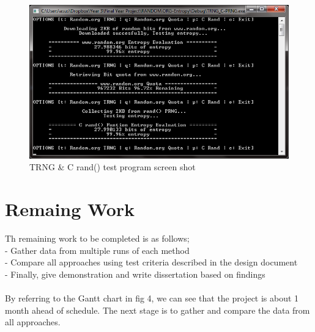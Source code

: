\documentclass[a4paper,10.5pt]{article}
\begin{document}
\begin{figure}[!h]
\centering
\includegraphics[width=120mm]{trng-ss.png}
\caption{TRNG \& C rand() test program screen shot}
\label{trng-ss}
\end{figure}

\section{Remaing Work}

Th remaining work to be completed is as follows;\\

\noindent - Gather data from multiple runs of each method\\
- Compare all approaches using test criteria described in the design document \\
- Finally, give demonstration and write dissertation based on findings\\\\
By referring to the Gantt chart in fig 4, we can see that the project is about 1 month ahead of schedule. The next stage is to gather and compare the data from all approaches.
\end{document}
